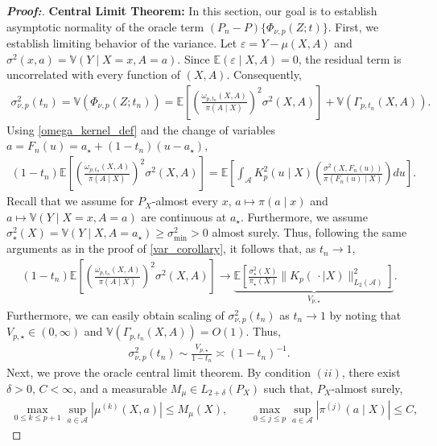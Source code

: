 \documentclass[10pt,a4paper]{amsart}
\begin{document}
\begin{proof}[\textbf{Proof:}]
\textbf{Central Limit Theorem:} In this section, our goal is to establish asymptotic normality of the oracle term $(P_n - P) \{\Phi_{\nu, p}(Z; t)\}$. First, we establish limiting behavior of the variance. Let $\varepsilon = Y-\mu(X,A)$ and $\sigma^2(x,a)=\mathbb{V}(Y\mid X=x,A=a)$. Since $\mathbb{E}(\varepsilon \mid X,A)=0$, the residual term is uncorrelated with every function of $(X,A)$. Consequently,
\begin{align*}
    \sigma_{\nu,p}^2(t_n) = \mathbb{V}(\Phi_{\nu, p}(Z; t_n)) = \mathbb{E} \! \left[ \left(\frac{\omega_{p,t_n}(X,A)}{\pi(A\mid X)} \right)^2\sigma^2(X,A) \right] + \mathbb{V}\!\left(\Gamma_{p,t_n}(X,A)\right).
\end{align*}
Using \cref{omega_kernel_def} and the change of variables $a=F_n(u)=a_\star+(1 - t_n)(u-a_\star)$,
\begin{align*}
    (1 - t_n) \mathbb{E}\!\left[\left(\frac{\omega_{p,t_n}(X,A)}{\pi(A\mid X)} \right)^2\sigma^2(X,A) \right] = \mathbb{E}\!\left[ \int_{\mathcal{A}} K^2_p(u\mid X) \left(\frac{\sigma^2(X,F_n(u))}{\pi(F_n(u)\mid X)} \right) du \right].
\end{align*}
Recall that we assume for $P_X$-almost every $x$, $a\mapsto\pi(a\mid x)$ and $a\mapsto \mathbb{V}(Y\mid X=x,A=a)$ are continuous at $a_\star$. Furthermore, we assume $\sigma_\star^2(X)=\mathbb{V}(Y\mid X,A=a_\star)\geq\sigma_{\min}^2>0$ almost surely. Thus, following the same arguments as in the proof of \cref{var_corollary}, it follows that, as $t_n \to 1$,
\begin{align*}
    (1 - t_n) \mathbb{E}\!\left[\left(\frac{\omega_{p,t_n}(X,A)}{\pi(A\mid X)} \right)^2\sigma^2(X,A) \right] \longrightarrow \underbrace{\mathbb{E} \! \left[ \frac{\sigma_\star^2(X)}{\pi_\star(X)} \| K_p(\, \cdot \mid X) \|^2_{L_2(\mathcal{A})} \right]}_{ V_{p,\star}}.
\end{align*}
Furthermore, we can easily obtain scaling of $\sigma_{\nu,p}^2(t_n)$ as $t_n \to 1$ by noting that $V_{p,\star} \in (0, \infty)$ and $ \mathbb{V}\!\left(\Gamma_{p,t_n}(X,A)\right) = O(1)$. Thus,
\begin{align*}
    \sigma_{\nu,p}^2(t_n) \sim \frac{V_{p,\star}}{1 - t_n} \asymp (1 - t_n)^{-1}.
\end{align*}
Next, we prove the oracle central limit theorem. By condition $(ii)$, there exist $\delta>0$, $C<\infty$, and a measurable
$M_\mu\in L_{2+\delta}(P_X)$ such that, $P_X$-almost surely,
\begin{align*}
    \max_{0\leq k\leq p+1} \sup_{a\in\mathcal{A}}|\mu^{(k)}(X,a)| \leq M_\mu(X), \qquad \max_{0\leq j\leq p} \sup_{a\in\mathcal{A}}|\pi^{(j)}(a\mid X)| \leq C,

\end{align*}
\end{proof}
\end{document}
